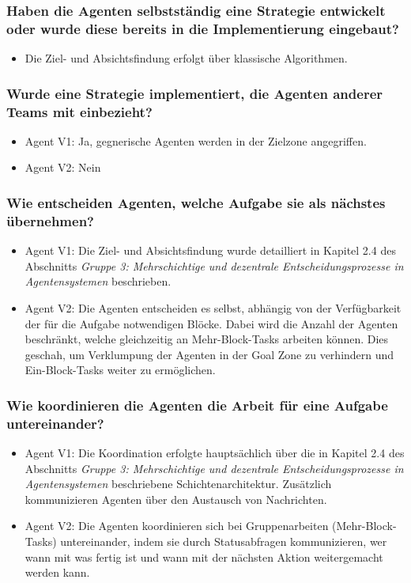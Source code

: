 \documentclass[runningheads]{llncs}
\newcommand{\refMain}{{\textit{Gruppe 3: Mehrschichtige und dezentrale Entscheidungsprozesse in Agentensystemen }}}
\begin{document}
	\subsubsection{Haben die Agenten selbstständig eine Strategie entwickelt oder wurde diese bereits in die Implementierung eingebaut?}
	\begin{itemize}
		\item Die Ziel- und Absichtsfindung erfolgt über klassische Algorithmen.
	\end{itemize}
	
	\subsubsection{Wurde eine Strategie implementiert, die Agenten anderer Teams mit einbezieht?}
	\begin{itemize}
		\item Agent V1: Ja, gegnerische Agenten werden in der Zielzone angegriffen.
		\item Agent V2: Nein
	\end{itemize}
	
	\subsubsection{Wie entscheiden Agenten, welche Aufgabe sie als nächstes übernehmen?}
	\begin{itemize}
		\item Agent V1: Die Ziel- und Absichtsfindung wurde detailliert in Kapitel 2.4 des Abschnitts \refMain beschrieben.
		\item Agent V2: Die Agenten entscheiden es selbst, abhängig von der Verfügbarkeit der für die Aufgabe notwendigen Blöcke. Dabei wird die Anzahl der Agenten beschränkt, welche gleichzeitig an Mehr-Block-Tasks arbeiten können. Dies geschah, um Verklumpung der Agenten in der Goal Zone zu verhindern und Ein-Block-Tasks weiter zu ermöglichen.
	\end{itemize}
	
	\subsubsection{Wie koordinieren die Agenten die Arbeit für eine Aufgabe untereinander?}
	\begin{itemize}
		\item Agent V1: Die Koordination erfolgte hauptsächlich über die in Kapitel 2.4 des Abschnitts \refMain beschriebene Schichtenarchitektur. Zusätzlich kommunizieren Agenten über den Austausch von Nachrichten.
		\item Agent V2: Die Agenten koordinieren sich bei Gruppenarbeiten (Mehr-Block-Tasks) untereinander, indem sie durch Statusabfragen kommunizieren, wer wann mit was fertig ist und wann mit der nächsten Aktion weitergemacht werden kann.
	\end{itemize}
	
\end{document}
